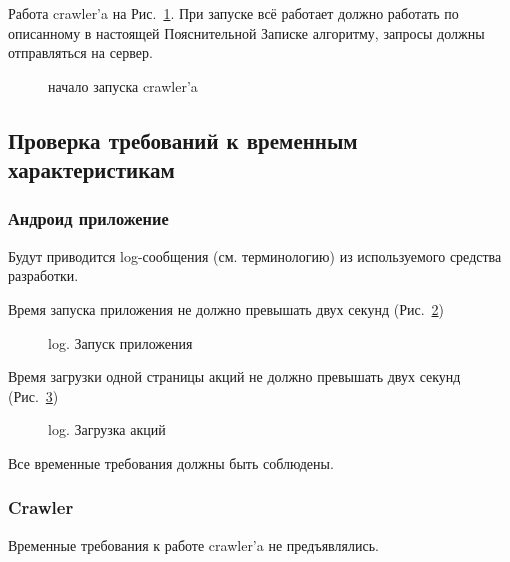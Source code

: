 \newpage
Работа crawler'a на Рис.~\ref{crawl_dixy}. При запуске всё работает должно
работать по описанному в настоящей Пояснительной Записке алгоритму, запросы
должны отправляться на сервер.

\begin{figure}[h!]
    \centering
    \caption{\small{начало запуска crawler'a}}
    \label{crawl_dixy}
\end{figure}


\newpage
\subsection{Проверка требований к временным характеристикам}
\subsubsection{Андроид приложение}
Будут приводится log-сообщения (см. терминологию) из используемого средства разработки.

Время запуска приложения не должно превышать двух секунд (Рис.~\ref{launch})

\begin{figure}[h!]
    \centering
    \caption{\small{log. Запуск приложения}}
    \label{launch}
\end{figure}


Время загрузки одной страницы акций не должно превышать двух секунд (Рис.~\ref{loading})

\begin{figure}[h!]
    \centering
    \caption{\small{log. Загрузка акций}}
    \label{loading}
\end{figure}
Все временные требования должны быть соблюдены.
\subsubsection{Crawler}
Временные требования к работе crawler'a не предъявлялись.
